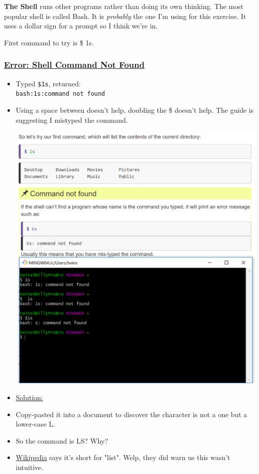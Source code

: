 \documentclass[12pt]{article}
\begin{document}
\textbf{The Shell} runs other programs rather than doing its own thinking. The most popular shell is called Bash. It is \textit{probably} the one I'm using for this exercise. It uses a dollar sign for a prompt so I think we're in.

First command to try is \$ 1s.

\subsubsection{\underline{Error: Shell Command Not Found}}\label{error:er13}
\begin{itemize}
    \item Typed \texttt{\$1s}, returned: \\\texttt{bash:1s:command not found}
    \item Using a space between doesn't help, doubling the \$ doesn't help. The guide is suggesting I mistyped the command.
    
    \includegraphics[width=\textwidth]{commandnotfound.PNG}
\end{itemize}
\begin{itemize}
\renewcommand{\labelitemi}{$\nobullet$}
\item \underline{Solution:}
\renewcommand{\labelitemi}{$\bullet$}
    \item Copy-pasted it into a document to discover the character is not a one but a lower-case L.
    \item So the command is LS? Why?
    \item \href{https://en.wikipedia.org/wiki/Ls}{Wikipedia} says it's short for "list". Welp, they did warn us this wasn't intuitive.
\end{itemize}
\end{document}
